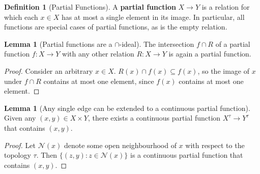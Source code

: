 \documentclass{tufte-handout}
\theoremstyle{definition}
\newtheorem{lemma}[theorem]{Lemma}
\newtheorem{defn}[theorem]{Definition}
\newtheorem{rem}[theorem]{Reminder}
\begin{document}

\begin{defn}[Partial Functions]
A \textbf{partial function} $X \rightarrow Y$ is a relation for which each $x \in X$ has at most a single element in its image. In particular, all functions are special cases of partial functions, as is the empty relation.
\end{defn}

\begin{lemma}[Partial functions are a $\cap$-ideal]\label{lem:capideal}
The intersection $f \cap R$ of a partial function $f: X \rightarrow Y$ with any other relation $R: X \rightarrow Y$ is again a partial function.
\begin{proof}
Consider an arbitrary $x \in X$. $R(x) \cap f(x) \subseteq f(x)$, so the image of $x$ under $f \cap R$ contains at most one element, since $f(x)$ contains at most one element.
\end{proof}
\end{lemma}

\begin{marginfigure}
\centering
{}
\caption{Regions of $\blacksquare$ in the image of the yellow point alone will be coloured yellow, and regions in the image of both yellow and cyan will be coloured green:}
\label{fig:yellowgreen}
\end{marginfigure}

\begin{lemma}[Any single edge can be extended to a continuous partial function]\label{lem:edgecomplete}
Given any $(x,y) \in X \times Y$, there exists a continuous partial function $X^\tau \rightarrow Y^\tau$ that contains $(x,y)$.
\begin{proof}
Let $\mathcal{N}(x)$ denote some open neighbourhood of $x$ with respect to the topology $\tau$. Then $\{ (z,y) : z \in \mathcal{N}(x) \}$ is a continuous partial function that contains $(x,y)$.
\end{proof}
\end{lemma}

\begin{marginfigure}
\centering
{}
\caption{Regions in the image of the cyan point alone cannot be open sets by continuity, so they are either points or lines. Points and lines in cyan must be surrounded by an open region in either yellow or green, or else we violate continuity (open sets in red).}
\label{fig:cyan}
\end{marginfigure}
\end{document}
